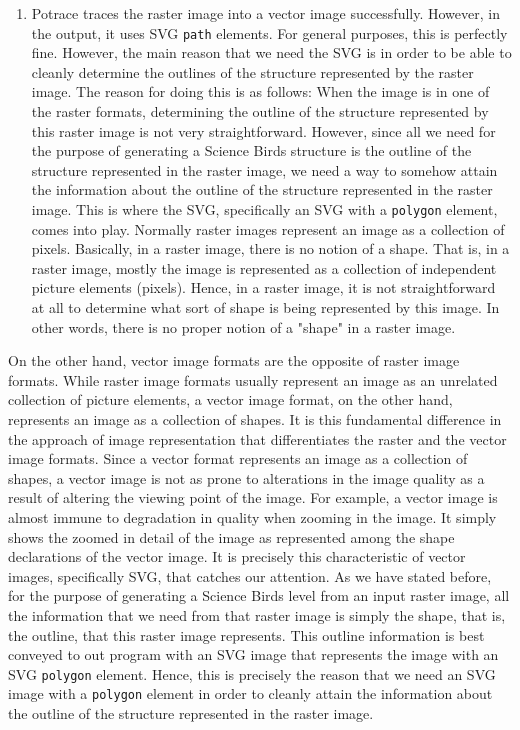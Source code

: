 \documentclass[12pt]{dalthesis}
\begin{document}
\begin{enumerate}
  \item Potrace traces the raster image into a vector image successfully. However, in the output, it uses SVG \lstinline{path} elements. For general purposes, this is perfectly fine. However, the main reason that we need the SVG is in order to be able to cleanly determine the outlines of the structure represented by the raster image. The reason for doing this is as follows: When the image is in one of the raster formats, determining the outline of the structure represented by this raster image is not very straightforward. However, since all we need for the purpose of generating a Science Birds structure is the outline of the structure represented in the raster image, we need a way to somehow attain the information about the outline of the structure represented in the raster image. This is where the SVG, specifically an SVG with a \lstinline{polygon} element, comes into play. Normally raster images represent an image as a collection of pixels. Basically, in a raster image, there is no notion of a shape. That is, in a raster image, mostly the image is represented as a collection of independent picture elements (pixels). Hence, in a raster image, it is not straightforward at all to determine what sort of shape is being represented by this image. In other words, there is no proper notion of a "shape" in a raster image.
\end{enumerate}

On the other hand, vector image formats are the opposite of raster image formats. While raster image formats usually represent an image as an unrelated collection of picture elements, a vector image format, on the other hand, represents an image as a collection of shapes. It is this fundamental difference in the approach of image representation that differentiates the raster and the vector image formats. Since a vector format represents an image as a collection of shapes, a vector image is not as prone to alterations in the image quality as a result of altering the viewing point of the image. For example, a vector image is almost immune to degradation in quality when zooming in the image. It simply shows the zoomed in detail of the image as represented among the shape declarations of the vector image. It is precisely this characteristic of vector images, specifically SVG, that catches our attention. As we have stated before, for the purpose of generating a Science Birds level from an input raster image, all the information that we need from that raster image is simply the shape, that is, the outline, that this raster image represents. This outline information is best conveyed to out program with an SVG image that represents the image with an SVG \lstinline{polygon} element. Hence, this is precisely the reason that we need an SVG image with a \lstinline{polygon} element in order to cleanly attain the information about the outline of the structure represented in the raster image.
\end{document}
